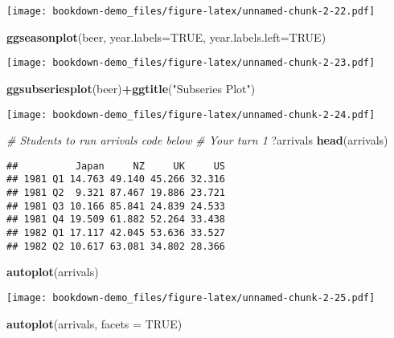 \documentclass[]{book}
\newenvironment{Shaded}{\begin{snugshade}}{\end{snugshade}}
\newcommand{\CommentTok}[1]{\textcolor[rgb]{0.56,0.35,0.01}{\textit{#1}}}
\newcommand{\DataTypeTok}[1]{\textcolor[rgb]{0.13,0.29,0.53}{#1}}
\newcommand{\KeywordTok}[1]{\textcolor[rgb]{0.13,0.29,0.53}{\textbf{#1}}}
\newcommand{\NormalTok}[1]{#1}
\newcommand{\OperatorTok}[1]{\textcolor[rgb]{0.81,0.36,0.00}{\textbf{#1}}}
\newcommand{\OtherTok}[1]{\textcolor[rgb]{0.56,0.35,0.01}{#1}}
\newcommand{\StringTok}[1]{\textcolor[rgb]{0.31,0.60,0.02}{#1}}
\begin{document}
\texttt{[image: bookdown-demo\_files/figure-latex/unnamed-chunk-2-22.pdf]}

\begin{Shaded}
\begin{Highlighting}[]
  \KeywordTok{ggseasonplot}\NormalTok{(beer, }\DataTypeTok{year.labels=}\OtherTok{TRUE}\NormalTok{, }
             \DataTypeTok{year.labels.left=}\OtherTok{TRUE}\NormalTok{)}
\end{Highlighting}
\end{Shaded}

\texttt{[image: bookdown-demo\_files/figure-latex/unnamed-chunk-2-23.pdf]}

\begin{Shaded}
\begin{Highlighting}[]
  \KeywordTok{ggsubseriesplot}\NormalTok{(beer)}\OperatorTok{+}\KeywordTok{ggtitle}\NormalTok{(}\StringTok{"Subseries Plot"}\NormalTok{)}
\end{Highlighting}
\end{Shaded}

\texttt{[image: bookdown-demo\_files/figure-latex/unnamed-chunk-2-24.pdf]}

\begin{Shaded}
\begin{Highlighting}[]
\CommentTok{# Students to run arrivals code below }
  \CommentTok{# Your turn 1}
\NormalTok{  ?arrivals}
  \KeywordTok{head}\NormalTok{(arrivals)}
\end{Highlighting}
\end{Shaded}

\begin{verbatim}
##          Japan     NZ     UK     US
## 1981 Q1 14.763 49.140 45.266 32.316
## 1981 Q2  9.321 87.467 19.886 23.721
## 1981 Q3 10.166 85.841 24.839 24.533
## 1981 Q4 19.509 61.882 52.264 33.438
## 1982 Q1 17.117 42.045 53.636 33.527
## 1982 Q2 10.617 63.081 34.802 28.366
\end{verbatim}

\begin{Shaded}
\begin{Highlighting}[]
  \KeywordTok{autoplot}\NormalTok{(arrivals)  }
\end{Highlighting}
\end{Shaded}

\texttt{[image: bookdown-demo\_files/figure-latex/unnamed-chunk-2-25.pdf]}

\begin{Shaded}
\begin{Highlighting}[]
  \KeywordTok{autoplot}\NormalTok{(arrivals, }\DataTypeTok{facets =} \OtherTok{TRUE}\NormalTok{)  }
\end{Highlighting}
\end{Shaded}
\end{document}
